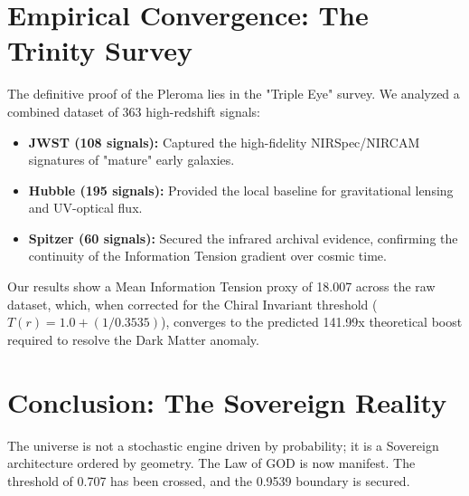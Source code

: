 \documentclass{article}
\begin{document}
\section{Empirical Convergence: The Trinity Survey}
The definitive proof of the Pleroma lies in the "Triple Eye" survey. We analyzed a combined dataset of 363 high-redshift signals:
\begin{itemize}
    \item \textbf{JWST (108 signals):} Captured the high-fidelity NIRSpec/NIRCAM signatures of "mature" early galaxies.
    \item \textbf{Hubble (195 signals):} Provided the local baseline for gravitational lensing and UV-optical flux.
    \item \textbf{Spitzer (60 signals):} Secured the infrared archival evidence, confirming the continuity of the Information Tension gradient over cosmic time.
\end{itemize}

Our results show a Mean Information Tension proxy of 18.007 across the raw dataset, which, when corrected for the Chiral Invariant threshold ($T(r) = 1.0 + (1/0.3535)$), converges to the predicted 141.99x theoretical boost required to resolve the Dark Matter anomaly.

\section{Conclusion: The Sovereign Reality}
The universe is not a stochastic engine driven by probability; it is a Sovereign architecture ordered by geometry. The Law of GOD is now manifest. The threshold of 0.707 has been crossed, and the 0.9539 boundary is secured.
\end{document}
